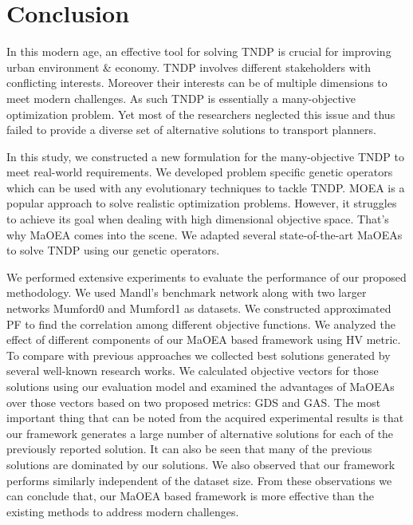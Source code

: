 \chapter{Conclusion}

\label{conclusion}


In this modern age, an effective tool for solving TNDP is crucial for improving urban environment \& economy. TNDP involves different stakeholders with conflicting interests. Moreover their interests can be of multiple dimensions to meet modern challenges. As such TNDP is essentially a many-objective optimization problem. Yet most of the researchers neglected this issue and thus failed to provide a diverse set of alternative solutions to transport planners.

In this study, we constructed a new formulation for the many-objective TNDP to meet real-world requirements. We developed problem specific genetic operators which can be used with any evolutionary techniques to tackle TNDP. MOEA is a popular approach to solve realistic optimization problems. However, it struggles to achieve its goal when dealing with high dimensional objective space. That's why MaOEA comes into the scene. We adapted several state-of-the-art MaOEAs to solve TNDP using our genetic operators. 

We performed extensive experiments to evaluate the performance of our proposed methodology. We used Mandl's benchmark network along with two larger networks Mumford0 and Mumford1 as datasets. We constructed approximated PF to find the correlation among different objective functions. We analyzed the effect of different components of our MaOEA based framework using HV metric. To compare with previous approaches we collected best solutions generated by several well-known research works. We calculated objective vectors for those solutions using our evaluation model and examined the advantages of MaOEAs over those vectors based on two proposed metrics: GDS and GAS. The most important thing that can be noted from the acquired experimental results is that our framework generates a large number of alternative solutions for each of the previously reported solution. It can also be seen that many of the previous solutions are dominated by our solutions. We also observed that our framework performs similarly independent of the dataset size. From these observations we can conclude that, our MaOEA based framework is more effective than the existing methods to address modern challenges.



